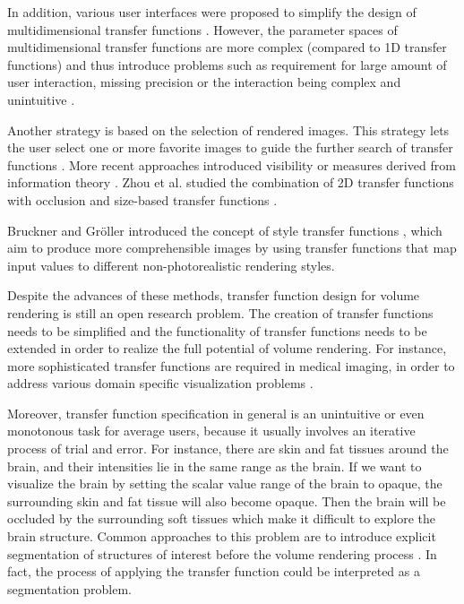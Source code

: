 In addition, various user interfaces were proposed to simplify the design of multidimensional transfer functions \cite{tzeng_novel_2003} \cite{tzeng_cluster-space_2004}.
However, the parameter spaces of multidimensional transfer functions are more complex (compared to 1D transfer functions) and thus introduce problems such as requirement for large amount of user interaction, missing precision or the interaction being complex and unintuitive \cite{arens_survey_2010}.

Another strategy is based on the selection of rendered images. This strategy lets the user select one or more favorite images to guide the further search of transfer functions \cite{marks_design_1997} \cite{wu_interactive_2007}. More recent approaches introduced visibility \cite{correa_visibility-driven_2009} \cite{correa_visibility_2011} or measures derived from information theory \cite{haidacher_information-based_2008} \cite{bruckner_isosurface_2010} \cite{ruiz_automatic_2011} \cite{bramon_information_2013}. Zhou et al. studied the combination of 2D transfer functions with occlusion and size-based transfer functions \cite{zhou_transfer_2012}.

Bruckner and Gr{\"o}ller introduced the concept of style transfer functions \cite{bruckner_style_2007}, which aim to produce more comprehensible images by using transfer functions that map input values to different non-photorealistic rendering styles.

Despite the advances of these methods, transfer function design for volume rendering is still an open research problem.
The creation of transfer functions needs to be simplified and the functionality of transfer functions needs to be extended in order to realize the full potential of volume rendering. For instance, more sophisticated transfer functions are required in medical imaging, in order to address various domain specific visualization problems \cite{lindholm_spatial_2010}.

Moreover, transfer function specification in general is an unintuitive or even monotonous task for average users, because it usually involves an iterative process of trial and error.
For instance, there are skin and fat tissues around the brain, and their intensities lie in the same range as the brain. If we want to visualize the brain by setting the scalar value range of the brain to opaque, the surrounding skin and fat tissue will also become opaque. Then the brain will be occluded by the surrounding soft tissues which make it difficult to explore the brain structure.
Common approaches to this problem are to introduce explicit segmentation of structures of interest before the volume rendering process \cite{rezk-salama_opacity_2006}. In fact, the process of applying the transfer function could be interpreted as a segmentation problem.

